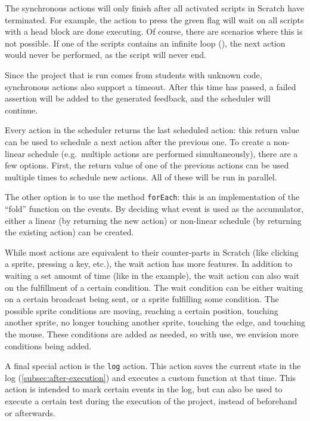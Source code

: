 \documentclass[../main]{subfiles}
\begin{document}
The synchronous actions will only finish after all activated scripts in Scratch have terminated.
For example, the action to press the green flag will wait on all scripts with a head block  are done executing.
Of course, there are scenarios where this is not possible.
If one of the scripts contains an infinite loop (), the next action would never be performed, as the script will never end.

Since the project that is run comes from students with unknown code, synchronous actions also support a timeout.
After this time has passed, a failed assertion will be added to the generated feedback, and the scheduler will continue.

Every action in the scheduler returns the last scheduled action: this return value can be used to schedule a next action after the previous one.
To create a non-linear schedule (e.g.\ multiple actions are performed simultaneously), there are a few options.
First, the return value of one of the previous actions can be used multiple times to schedule new actions.
All of these will be run in parallel.


The other option is to use the method \texttt{forEach}: this is an implementation of the ``fold'' function on the events.
By deciding what event is used as the accumulator, either a linear (by returning the new action) or non-linear schedule (by returning the existing action) can be created.

While most actions are equivalent to their counter-parts in Scratch (like clicking a sprite, pressing a key, etc.), the wait action has more features.
In addition to waiting a set amount of time (like in the example), the wait action can also wait on the fulfillment of a certain condition.
The wait condition can be either waiting on a certain broadcast being sent, or a sprite fulfilling some condition.
The possible sprite conditions are moving, reaching a certain position, touching another sprite, no longer touching another sprite, touching the edge, and touching the mouse.
These conditions are added as needed, so with use, we envision more conditions being added.

A final special action is the \texttt{log} action.
This action saves the current state in the log (\cref{subsec:after-execution}) and executes a custom function at that time.
This action is intended to mark certain events in the log, but can also be used to execute a certain test during the execution of the project, instead of beforehand or afterwards.
\end{document}
